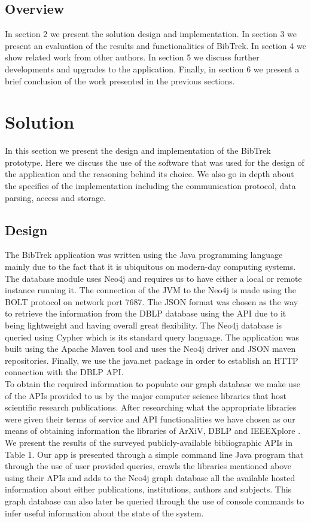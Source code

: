 \documentclass[twocolumn]{article}
\begin{document}
\subsection{Overview}
In section 2 we present the solution design and implementation. In section 3 we present an evaluation of the results and functionalities of BibTrek. In section 4 we show related work from other authors. In section 5 we discuss further developments and upgrades to the application. Finally, in section 6 we present a brief conclusion of the work presented in the previous sections. \\[1\baselineskip]


\section{Solution}

In this section we present the design and implementation of the BibTrek prototype. Here we discuss the use of the software that was used for the design of the application and the reasoning behind its choice. We also go in depth about the specifics of the implementation including the communication protocol, data parsing, access and storage.

\subsection{Design}
The BibTrek application was written using the Java programming language mainly due to the fact that it is ubiquitous on modern-day computing systems. The database module uses Neo4j and requires us to have either a local or remote instance running it. The connection of the JVM to the Neo4j is made using the BOLT protocol on network port 7687. The JSON format was chosen as the way to retrieve the information from the DBLP database using the API due to it being lightweight and having overall great flexibility. The Neo4j database is queried using Cypher\cite{cypher} which is its standard query language. The application was built using the Apache Maven tool and uses the Neo4j driver and JSON maven repositories. Finally, we use the java.net package in order to establish an HTTP connection with the DBLP API.
\\[1\baselineskip]
To obtain the required information to populate our graph database we make use of the APIs provided to us by the major computer science libraries that host scientific research publications. After researching what the appropriate libraries were given their terms of service and API functionalities we have chosen as our means of obtaining information the libraries of ArXiV, DBLP and IEEEXplore \cite{arxiv, dblp, ieeexplore}. We present the results of the surveyed publicly-available bibliographic APIs in Table 1. Our app is presented through a simple command line Java program that through the use of user provided queries, crawls the libraries mentioned above using their APIs and adds to the Neo4j\cite{neo4j} graph database all the available hosted information about either publications, institutions, authors and subjects. This graph database can also later be queried through the use of console commands to infer useful information about the state of the system. 
\end{document}
